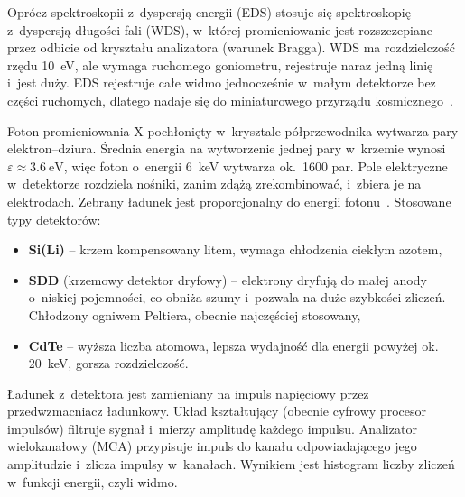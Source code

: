 \begin{przeniesione}
Oprócz spektroskopii z~dyspersją energii (EDS) stosuje się spektroskopię
z~dyspersją długości fali (WDS), w~której promieniowanie jest
rozszczepiane przez odbicie od kryształu analizatora (warunek Bragga).
WDS ma rozdzielczość rzędu \SI{10}{\electronvolt}, ale wymaga ruchomego
goniometru, rejestruje naraz jedną linię i~jest duży. EDS rejestruje całe
widmo jednocześnie w~małym detektorze bez części ruchomych, dlatego
nadaje się do miniaturowego przyrządu kosmicznego~\cite{goldstein2018sem}.
\end{przeniesione}

Foton promieniowania X pochłonięty w~krysztale półprzewodnika wytwarza
pary elektron--dziura. Średnia energia na wytworzenie jednej pary
w~krzemie wynosi $\varepsilon\approx\SI{3.6}{\electronvolt}$, więc foton
o~energii \SI{6}{\kilo\electronvolt} wytwarza ok.~\num{1600} par. Pole
elektryczne w~detektorze rozdziela nośniki, zanim zdążą zrekombinować,
i~zbiera je na elektrodach. Zebrany ładunek jest proporcjonalny do
energii fotonu~\cite{urbanski2023detection}. Stosowane typy detektorów:
\begin{itemize}
  \item \textbf{Si(Li)} -- krzem kompensowany litem, wymaga chłodzenia
        ciekłym azotem,
  \item \textbf{SDD} (krzemowy detektor dryfowy) -- elektrony dryfują do
        małej anody o~niskiej pojemności, co obniża szumy i~pozwala na
        duże szybkości zliczeń. Chłodzony ogniwem Peltiera, obecnie
        najczęściej stosowany,
  \item \textbf{CdTe} -- wyższa liczba atomowa, lepsza wydajność dla
        energii powyżej ok. \SI{20}{\kilo\electronvolt}, gorsza
        rozdzielczość.
\end{itemize}

Ładunek z~detektora jest zamieniany na impuls napięciowy przez
przedwzmacniacz ładunkowy. Układ kształtujący (obecnie cyfrowy procesor
impulsów) filtruje sygnał i~mierzy amplitudę każdego impulsu.
Analizator wielokanałowy (MCA) przypisuje impuls do kanału odpowiadającego
jego amplitudzie i~zlicza impulsy w~kanałach. Wynikiem jest histogram
liczby zliczeń w~funkcji energii, czyli widmo.

